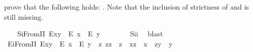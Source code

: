\begin{isabellebody}
\begin{isamarkuptext}
{prove that the following holds: . Note that the inclusion of strictness of  and  is still missing.}%
\end{isamarkuptext}\isamarkuptrue%
\ \ \isamarkupfalse%
\ S\isactrlsub iFromII{\isacharcolon}\ {\isachardoublequoteopen}E{\isacharparenleft}x{\isasymcdot}y{\isacharparenright}\ \isactrlbold {\isasymrightarrow}\ {\isacharparenleft}E\ x\ \isactrlbold {\isasymand}\ E\ y{\isacharparenright}{\isachardoublequoteclose}\ \ \isanewline
%
\isadelimproof
\ \ \ \ %
\endisadelimproof
%
\isatagproof
{}\isamarkupfalse%
\ S\isactrlsub i\isactrlsub i\ \isamarkupfalse%
\ blast%
\endisatagproof
{\isafoldproof}%
%
\isadelimproof
\isanewline
%
\endisadelimproof
\ \ \isamarkupfalse%
\ E\isactrlsub iFromII{\isacharcolon}\ {\isachardoublequoteopen}E{\isacharparenleft}x{\isasymcdot}y{\isacharparenright}\ \isactrlbold {\isasymleftarrow}\ {\isacharparenleft}E\ x\ \isactrlbold {\isasymand}\ E\ y\ \isactrlbold {\isasymand}\ {\isacharparenleft}\isactrlbold {\isasymexists}z{\isachardot}\ z{\isasymcdot}z\ {\isasymcong}\ z\ \isactrlbold {\isasymand}\ x{\isasymcdot}z\ {\isasymcong}\ x\ \isactrlbold {\isasymand}\ z{\isasymcdot}y\ {\isasymcong}\ y{\isacharparenright}{\isacharparenright}{\isachardoublequoteclose}\ \isanewline

\end{isabellebody}
